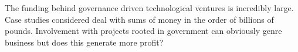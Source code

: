 {}

The funding behind governance driven technological ventures is incredibly large.
Case studies considered deal with sums of money in the order of billions of pounds.
Involvement with projects rooted in government can obviously genre business but does this generate more profit?

